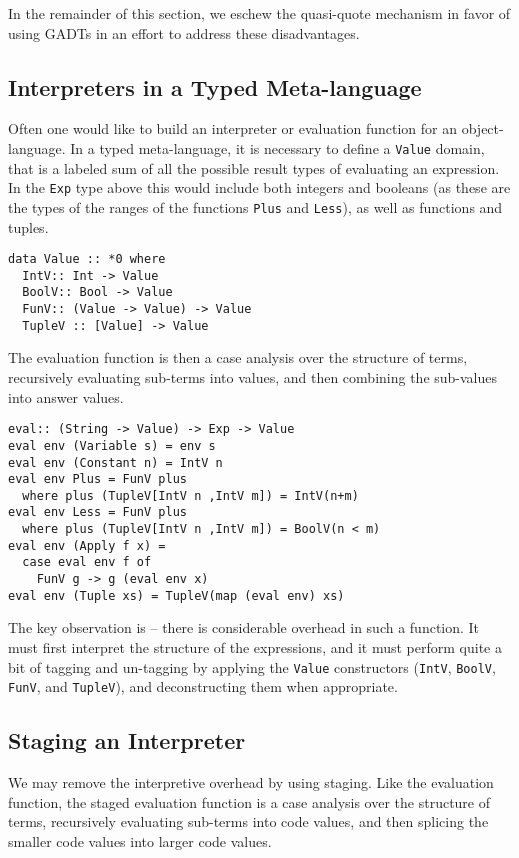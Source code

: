 \documentclass[11pt,twoside,A4]{llncs}
\begin{document}
In the remainder of this section, we eschew the quasi-quote mechanism
in favor of using GADTs in an effort to address these disadvantages.

\subsection{Interpreters in a Typed Meta-language}

Often one would like to build an interpreter or evaluation function
for an object-language. In a typed meta-language, it is
necessary to define a {\tt Value} domain, that is a labeled sum of
all the possible result types of evaluating an expression. In the {\tt Exp}
type above this would include both integers and booleans (as these are the 
types of the ranges of the functions {\tt Plus} and {\tt Less}), as
well as functions and tuples.

{\small 
\begin{verbatim}
data Value :: *0 where
  IntV:: Int -> Value
  BoolV:: Bool -> Value
  FunV:: (Value -> Value) -> Value
  TupleV :: [Value] -> Value
\end{verbatim}}

The evaluation function is then a case analysis over the
structure of terms, recursively evaluating sub-terms into
values, and then combining the sub-values into 
answer values.

{\small 
\begin{verbatim}
eval:: (String -> Value) -> Exp -> Value
eval env (Variable s) = env s
eval env (Constant n) = IntV n
eval env Plus = FunV plus
  where plus (TupleV[IntV n ,IntV m]) = IntV(n+m)
eval env Less = FunV plus
  where plus (TupleV[IntV n ,IntV m]) = BoolV(n < m) 
eval env (Apply f x) = 
  case eval env f of
    FunV g -> g (eval env x)
eval env (Tuple xs) = TupleV(map (eval env) xs)    
\end{verbatim}}
\noindent
The key observation is -- there is considerable overhead in such a function. It must first
interpret the structure of the expressions, and it must perform quite a bit of tagging
and un-tagging by applying the {\tt Value} constructors ({\tt IntV}, {\tt BoolV}, {\tt
FunV}, and {\tt TupleV}), and deconstructing them when appropriate.

\subsection{Staging an Interpreter}

We may remove the interpretive overhead by using staging.
Like the evaluation function, the staged evaluation function is a case analysis over the
structure of terms, recursively evaluating sub-terms into
code values, and then splicing the smaller code values into
larger code values. 
\end{document}
